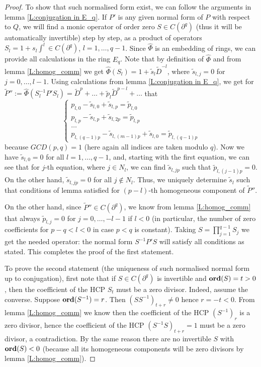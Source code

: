 \documentclass[11pt]{article}
\theoremstyle{definition}
\newcommand{\Ord}{\mathop {\rm \bf ord}}
\theoremstyle{plain}
\numberwithin{equation}{section}
\begin{document}
\begin{proof}
To show that such normalised form exist, we can follow the arguments in lemma \ref{L:conjugation in E_q}. If $P'$ is any given normal form of $P$ with respect to $Q$,  we will find a monic operator of order zero $S\in C(\partial^q)$ (thus it will be automatically invertible) step by step, as a product of operators $S_l=1+s_l \int^{l}\in C(\partial^q)$, $l=1,\ldots ,q-1$. Since $\hat{\Phi}$ is an embedding of rings, we can provide all calculations in the ring $E_q$. Note that by definition of $\hat{\Phi}$ and from lemma \ref{L:homog_comm} we get $\hat{\Phi}(S_l)=1+\tilde{s}_l \tilde{D}^{-l}$, where $\tilde{s}_{l,j}=0$ for $j=0, \ldots , l-1$. Using calculations from lemma \ref{L:conjugation in E_q}, we get for 
$\tilde{P}'':=\hat{\Phi}( S_l^{-1}P'S_l)= \tilde{D}^p+\ldots + \tilde{p}_l\tilde{D}^{p-l}+\ldots$ that
$$
\begin{cases}
p_{l,0}-\tilde{s}_{l,0}+\tilde{s}_{l,p}=\tilde{p}_{l,0} \\
p_{l,p}-\tilde{s}_{l,p}+\tilde{s}_{l,2p}=\tilde{p}_{l,p} \\
\ldots \\
p_{l,(q-1)p}-\tilde{s}_{l,(m-1)p}+\tilde{s}_{l,0}=\tilde{p}_{l,(q-1)p}
\end{cases}
$$ 
because $GCD(p,q)=1$ (here again all indices are taken modulo $q$). Now we have $\tilde{s}_{l,0}=0$ for all $l=1,\ldots ,q-1$, and, starting with the first equation, we can see that for $j$-th equation, where $j\in N_l$, we can find $\tilde{s}_{l,jp}$ such that $\tilde{p}_{l,(j-1)p}=0$. On the other hand, $\tilde{s}_{l,jp}=0$ for all $j\notin N_l$. Thus, we uniquely determine $\tilde{s}_l$ such that conditions of lemma satisfied for $(p-l)$-th homogeneous component of $\tilde{P}''$. 

On the other hand, since $\tilde{P}''\in C(\partial^q)$, we know from lemma \ref{L:homog_comm} that always $\tilde{p}_{l,j}=0$ for $j=0,\ldots , -l-1$ if $l<0$ (in particular, the number of zero coefficients for $p-q<l<0$ in case $p<q$ is constant). Taking $S=\prod_{j=1}^{q-1}S_j$ we get the needed operator: the normal form $S^{-1}P'S$ will satisfy all conditions as stated. This completes the proof of the first statement. 

To prove the second statement (the uniqueness of such normalised normal form up to conjugation), first note that if $S\in C(\partial^q)$ is invertible and $\Ord (S)=t>0$, then the coefficient of the HCP $S_t$ must be a zero divisor. Indeed, assume the converse. Suppose $\Ord (S^{-1})=r$. Then $(SS^{-1})_{t+r}\neq 0$ hence $r=-t<0$. From lemma \ref{L:homog_comm} we know then the coefficient of the HCP $(S^{-1})_r$ is a zero divisor, hence the coefficient of the HCP  $(S^{-1}S)_{t+r}=1$ must be a zero divisor, a contradiction. By the same reason there are no invertible $S$ with $\Ord (S)<0$ (because all its homogeneous components will be zero divisors by lemma \ref{L:homog_comm}). 


\end{proof}
\end{document}
